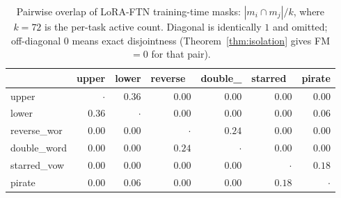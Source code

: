 \begin{table}[t]
\caption{Pairwise overlap of LoRA-FTN training-time masks: $|m_i\cap m_j|/k$, where $k=72$ is the per-task active count. Diagonal is identically $1$ and omitted; off-diagonal $0$ means exact disjointness (Theorem~\ref{thm:isolation} gives FM$=0$ for that pair).}
\label{tab:lora_overlap}
\vskip 0.05in
\begin{center}\begin{small}
\begin{tabular}{lrrrrrr}
\toprule
 & upper & lower & reverse\ & double\_ & starred\ & pirate \\
\midrule
upper & $\cdot$ & $0.36$ & $0.00$ & $0.00$ & $0.00$ & $0.00$ \\
lower & $0.36$ & $\cdot$ & $0.00$ & $0.00$ & $0.00$ & $0.06$ \\
reverse\_wor & $0.00$ & $0.00$ & $\cdot$ & $0.24$ & $0.00$ & $0.00$ \\
double\_word & $0.00$ & $0.00$ & $0.24$ & $\cdot$ & $0.00$ & $0.00$ \\
starred\_vow & $0.00$ & $0.00$ & $0.00$ & $0.00$ & $\cdot$ & $0.18$ \\
pirate & $0.00$ & $0.06$ & $0.00$ & $0.00$ & $0.18$ & $\cdot$ \\
\bottomrule
\end{tabular}
\end{small}\end{center}
\vskip -0.1in
\end{table}
